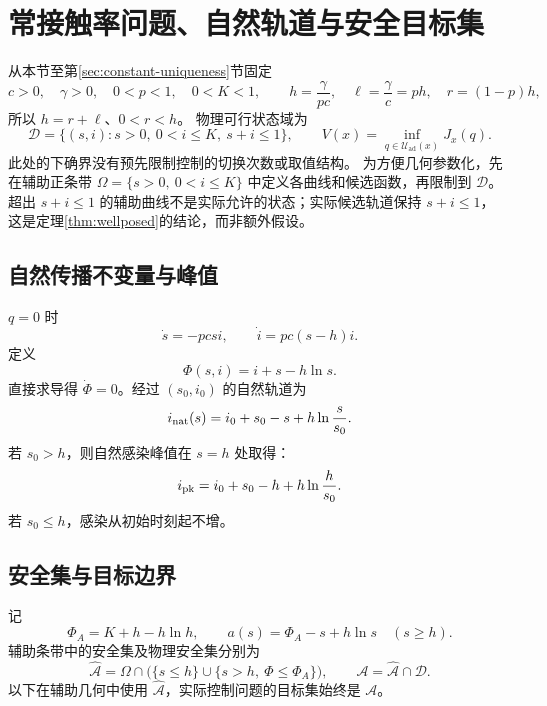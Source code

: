 \documentclass[11pt,a4paper,UTF8]{ctexart}
\theoremstyle{definition}
\newcommand{\Acal}{\mathcal A}
\newcommand{\Dcal}{\mathcal D}
\newcommand{\Uad}{\mathcal U_{\mathrm{ad}}}
\begin{document}
\section{常接触率问题、自然轨道与安全目标集}
\label{sec:constant-problem}
从本节至第\ref{sec:constant-uniqueness}节固定
\begin{equation}
c>0,\quad\gamma>0,\quad0<p<1,\quad0<K<1,
\qquad h=\frac{\gamma}{pc},\quad\ell=\frac{\gamma}{c}=ph,\quad r=(1-p)h,
\label{eq:constants}
\end{equation}
所以 $h=r+\ell$、$0<r<h$。
物理可行状态域为
\begin{equation}
\Dcal=\{(s,i):s>0,\ 0<i\le K,\ s+i\le1\},\qquad
V(x)=\inf_{q\in\Uad(x)}J_x(q).
\label{eq:value-definition}
\end{equation}
此处的下确界没有预先限制控制的切换次数或取值结构。
为方便几何参数化，先在辅助正条带
$\Omega=\{s>0,\ 0<i\le K\}$ 中定义各曲线和候选函数，再限制到 $\Dcal$。
超出 $s+i\le1$ 的辅助曲线不是实际允许的状态；实际候选轨道保持 $s+i\le1$，
这是定理\ref{thm:wellposed}的结论，而非额外假设。

\subsection{自然传播不变量与峰值}
$q=0$ 时
\begin{equation}
\dot s=-pcsi,\qquad \dot i=pc(s-h)i.
\label{eq:q0-system}
\end{equation}
定义
\begin{equation}
\Phi(s,i)=i+s-h\ln s.
\label{eq:Phi}
\end{equation}
直接求导得 $\dot\Phi=0$。经过 $(s_0,i_0)$ 的自然轨道为
\begin{equation}
i_{\rm nat}(s)=i_0+s_0-s+h\ln\frac{s}{s_0}.
\label{eq:natural-orbit}
\end{equation}
若 $s_0>h$，则自然感染峰值在 $s=h$ 处取得：
\begin{equation}
i_{\rm pk}=i_0+s_0-h+h\ln\frac h{s_0}.
\label{eq:natural-peak}
\end{equation}
若 $s_0\le h$，感染从初始时刻起不增。

\subsection{安全集与目标边界}
记
\begin{equation}
\Phi_A=K+h-h\ln h,\qquad
 a(s)=\Phi_A-s+h\ln s\quad(s\ge h).
\label{eq:safe-boundary}
\end{equation}
辅助条带中的安全集及物理安全集分别为
\begin{equation}
\widehat{\Acal}=\Omega\cap\bigl(\{s\le h\}\cup\{s>h,\ \Phi\le\Phi_A\}\bigr),
\qquad \Acal=\widehat{\Acal}\cap\Dcal.
\label{eq:safe-set}
\end{equation}
以下在辅助几何中使用 $\widehat{\Acal}$，实际控制问题的目标集始终是 $\Acal$。
\end{document}
